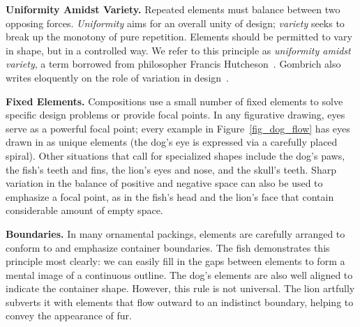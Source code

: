 \begin{items}
\item \textbf{Uniformity Amidst Variety.} Repeated elements must balance
  between two opposing forces.  \textit{Uniformity} 
  aims for an overall unity of design; \textit{variety}
  seeks to break up the monotony of
  pure repetition.  Elements should be permitted to vary in shape,
  but in a controlled way.  We refer to this principle
  as \textit{uniformity amidst variety}, a term borrowed from 
  philosopher Francis Hutcheson~\cite{Hutcheson1729}.
  Gombrich also writes eloquently on the role of variation in 
  design~\cite{Gombrich}.

\item \textbf{Fixed Elements.} Compositions use a small number of fixed
  elements to solve specific design problems or provide focal points.
  In any figurative drawing, eyes serve as a powerful focal point;
  every example in Figure~\ref{fig_dog_flow} has eyes drawn
  in as unique elements
  (the dog's eye is expressed via a carefully placed spiral).  Other
  situations that call for specialized shapes include the dog's paws,
  the fish's teeth and fins, 
  the lion's eyes and nose, %
  and the skull's teeth.
  Sharp variation in the balance of positive and negative space
  can also be used to emphasize a focal point,
  as in the fish's head and the lion's face that contain considerable amount of empty space.

\item \textbf{Boundaries.} In many ornamental packings, elements are
  carefully arranged to conform to and emphasize container boundaries.
  The fish demonstrates this principle most clearly: we can easily
  fill in the gaps between elements to form a mental image of a continuous
  outline.  The dog's elements are also well aligned to indicate the
  container shape.  However, this rule is not universal.  
  The lion artfully subverts it with elements that flow outward to an
  indistinct boundary, helping to convey the appearance of fur.
\end{items}


